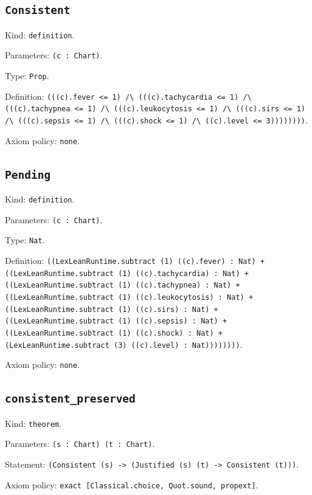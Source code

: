 \documentclass[11pt]{article}
\begin{document}
\subsection*{\texttt{Consistent}}
\noindent Kind: \texttt{definition}.\par
\noindent Parameters: \texttt{(c : Chart)}.\par
\noindent Type: \texttt{Prop}.\par
\noindent Definition: \texttt{(((c).fever <= 1) /\textbackslash{} (((c).tachycardia <= 1) /\textbackslash{} (((c).tachypnea <= 1) /\textbackslash{} (((c).leukocytosis <= 1) /\textbackslash{} (((c).sirs <= 1) /\textbackslash{} (((c).sepsis <= 1) /\textbackslash{} (((c).shock <= 1) /\textbackslash{} ((c).level <= 3))))))))}.\par
\noindent Axiom policy: \texttt{none}.\par
\subsection*{\texttt{Pending}}
\noindent Kind: \texttt{definition}.\par
\noindent Parameters: \texttt{(c : Chart)}.\par
\noindent Type: \texttt{Nat}.\par
\noindent Definition: \texttt{((LexLeanRuntime.subtract (1) ((c).fever) : Nat) + ((LexLeanRuntime.subtract (1) ((c).tachycardia) : Nat) + ((LexLeanRuntime.subtract (1) ((c).tachypnea) : Nat) + ((LexLeanRuntime.subtract (1) ((c).leukocytosis) : Nat) + ((LexLeanRuntime.subtract (1) ((c).sirs) : Nat) + ((LexLeanRuntime.subtract (1) ((c).sepsis) : Nat) + ((LexLeanRuntime.subtract (1) ((c).shock) : Nat) + (LexLeanRuntime.subtract (3) ((c).level) : Nat))))))))}.\par
\noindent Axiom policy: \texttt{none}.\par
\subsection*{\texttt{consistent\_preserved}}
\noindent Kind: \texttt{theorem}.\par
\noindent Parameters: \texttt{(s : Chart) (t : Chart)}.\par
\noindent Statement: \texttt{(Consistent (s) -> (Justified (s) (t) -> Consistent (t)))}.\par
\noindent Axiom policy: \texttt{exact [Classical.choice, Quot.sound, propext]}.\par
\end{document}

